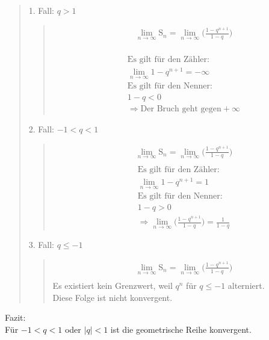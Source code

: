 \begin{quote}
	1. Fall: $ q>1 $\\
	\begin{quote}
		\begin{align*}
		&\lim\limits_ {n\to\infty}\mathrm{S}_n=\lim\limits_ {n\to\infty}\bigg(\frac{1-q^{n+1}}{1-q}\bigg)\\
		\end{align*}
		
		\begin{align*}
		&\text{Es gilt für den Zähler: }\\
		&\lim\limits_ {n\to\infty}1-q^{n+1}=-\infty\\
		&\text{Es gilt für den Nenner: }\\
		&1-q<0\\
		&\Rightarrow \text{Der Bruch geht gegen}+\infty
		\end{align*}
		
	\end{quote}
	2. Fall: $ -1<q<1 $\\
	\begin{quote}
		\begin{align*}
		&\lim\limits_ {n\to\infty}\mathrm{S}_n=\lim\limits_ {n\to\infty}\bigg(\frac{1-q^{n+1}}{1-q}\bigg)\\
		\end{align*}
		\begin{align*}
		&\text{Es gilt für den Zähler: }\\
		&\lim\limits_ {n\to\infty}1-q^{n+1}=1\\
		&\text{Es gilt für den Nenner: }\\
		&1-q>0\\
		&\Rightarrow \lim\limits_ {n\to\infty}\biggl(\frac{1-q^{n+1}}{1-q}\biggr)=\frac{1}{1-q}
		\end{align*}
	\end{quote}
	3. Fall: $ q\leq -1 $\\
	\begin{quote}
		\begin{align*}
		&\lim\limits_ {n\to\infty}\mathrm{S}_n=\lim\limits_ {n\to\infty}\bigg(\frac{1-q^{n+1}}{1-q}\bigg)\\
		\end{align*}
		Es existiert kein Grenzwert, weil $ q^n $ für $ q\leq -1 $ alterniert.\\
		Diese Folge ist nicht konvergent.\\
	\end{quote}
\end{quote}
Fazit:\\
Für $ -1<q<1 $ oder $ |q| <1$ ist die geometrische Reihe konvergent.\\
\begin{center}
\end{center}
